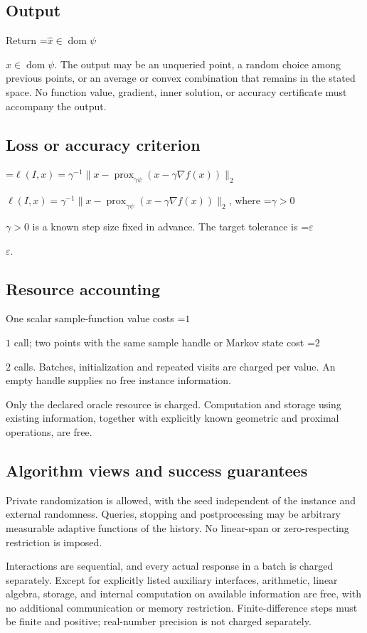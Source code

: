 \documentclass[10pt,a4paper]{article}
\newcommand{\AtlasMath}[1]{\par\begingroup\centering\setbox0=\hbox{$\displaystyle #1$}\ifdim\wd0>1.4\linewidth\typeout{ATLAS WIDE FORMULA: \the\wd0}\fi\ifdim\wd0>\linewidth\resizebox{\linewidth}{!}{\box0}\else\box0\fi\par\endgroup}
\newcommand{\AtlasInlineMath}[1]{\begingroup\setbox0=\hbox{$#1$}\ifdim\wd0>.4\linewidth\endgroup\AtlasMath{#1}\else\endgroup$#1$\fi}
\begin{document}
\subsection{Output}
Return \AtlasInlineMath{\widehat{x}\in \operatorname{dom}\psi}. The output may be an unqueried point, a random choice among previous points, or an average or convex combination that remains in the stated space. No function value, gradient, inner solution, or accuracy certificate must accompany the output.

\subsection{Loss or accuracy criterion}
\AtlasInlineMath{\ell(I,x)=\gamma^{-1}\|x-\operatorname{prox}_{\gamma\psi}(x-\gamma\nabla f(x))\|_2}, where \AtlasInlineMath{\gamma>0} is a known step size fixed in advance. The target tolerance is \AtlasInlineMath{\varepsilon}.

\subsection{Resource accounting}
One scalar sample-function value costs \AtlasInlineMath{1} call; two points with the same sample handle or Markov state cost \AtlasInlineMath{2} calls. Batches, initialization and repeated visits are charged per value. An empty handle supplies no free instance information.

Only the declared oracle resource is charged. Computation and storage using existing information, together with explicitly known geometric and proximal operations, are free.

\subsection{Algorithm views and success guarantees}
Private randomization is allowed, with the seed independent of the instance and external randomness. Queries, stopping and postprocessing may be arbitrary measurable adaptive functions of the history. No linear-span or zero-respecting restriction is imposed.

Interactions are sequential, and every actual response in a batch is charged separately. Except for explicitly listed auxiliary interfaces, arithmetic, linear algebra, storage, and internal computation on available information are free, with no additional communication or memory restriction. Finite-difference steps must be finite and positive; real-number precision is not charged separately.
\end{document}
